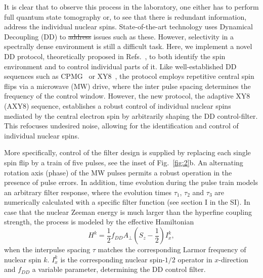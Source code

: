 \documentclass[aps,prl,floatfix,twocolumn,footinbib,superscriptaddress]{revtex4-1}
\providecommand{\DIFadd}[1]{{\protect\color{blue}\uwave{#1}}} %
\providecommand{\DIFdel}[1]{{\protect\color{red}\sout{#1}}}                      %
\providecommand{\DIFaddbegin}{} %
\providecommand{\DIFaddend}{} %
\providecommand{\DIFdelbegin}{} %
\providecommand{\DIFdelend}{} %
\begin{document}
It is clear that to observe this process in the laboratory, one either has to perform full quantum state tomography or, to see that there is redundant information, address the individual nuclear spins. State-of-the-art technology uses Dynamical Decoupling (DD) to \DIFdelbegin \DIFdel{address }\DIFdelend \DIFaddbegin \DIFadd{tackle }\DIFaddend issues such as these. However, selectivity in a spectrally dense environment is still a difficult task. Here, we implement a novel DD protocol, theoretically proposed in Refs.~\cite{Cas2015,Cas17}, to both identify the spin environment and to control individual parts of it. Like well-established DD sequences such as CPMG~\cite{MAUDSLEY1986488} or XY8~\cite{gull90}, the protocol employs repetitive central spin flips via a microwave (MW) drive, where the inter pulse spacing determines the frequency of the control window. However, the new protocol, the adaptive XY8 (AXY8) sequence, establishes a robust control of individual nuclear spins mediated by the central electron spin by arbitrarily shaping the DD control-filter. This refocuses undesired noise, allowing for the identification and control of individual nuclear spins. 

More specifically, control of the filter design is supplied by replacing each single spin flip by a train of five pulses, see the inset of Fig.~\ref{fig:2}b. An alternating rotation axis (phase) of the MW pulses permits a robust operation in the presence of pulse errors. In addition, time evolution during the pulse train models an arbitrary filter response, where the evolution times $\tau_1$, $\tau_2$ and $\tau_3$ are numerically calculated with a specific filter function (see section \RN{1} in the SI). In case that the nuclear Zeeman energy is much larger than the hyperfine coupling strength, the process is modeled by the effective Hamiltonian~\cite{Cas2015}
\begin{equation}
H^k = \frac{1}{2}f_{DD}A_\perp \left(S_z -\frac{1}{2}\right) I^k_x,
\label{eq:EM1}
\end{equation}
when the interpulse spacing $\tau$ matches the corresponding Larmor frequency of nuclear spin $k$. $I_x^k$ is the corresponding nuclear spin-$1/2$ operator in $x$-direction and $f_{DD}$ a variable parameter, determining the DD control filter. 
\end{document}
